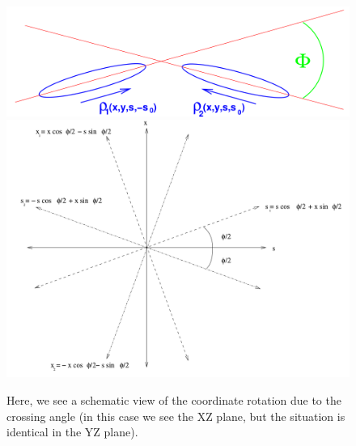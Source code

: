 \begin{figure}
\begin{center}
\includegraphics[width=\linewidth,height=0.5\textheight,keepaspectratio]{./figures/xing_bunch}
\includegraphics[width=\linewidth,height=0.5\textheight,keepaspectratio]{./figures/bunch_rotation}
\caption{ 
Here, we see a schematic view of the coordinate rotation due to the crossing
angle (in this case we see the XZ plane, but the situation is identical in the
YZ plane).
}
\label{fig:xz_angle}
\end{center}
\end{figure}
